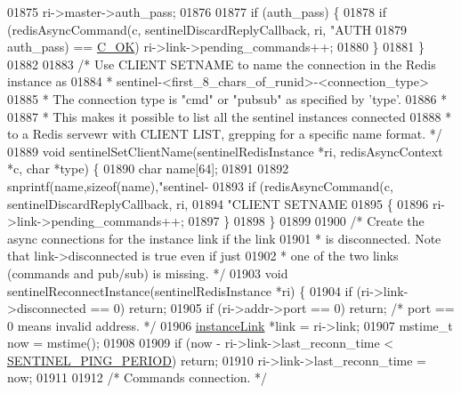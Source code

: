\begin{DoxyCode}
{{{{{{{{{{{{{{{{{{{{{{{{{{{{{{{{{01875                                                  ri->master->auth\_pass;
01876 
01877     \textcolor{keywordflow}{if} (auth\_pass) \{
01878         \textcolor{keywordflow}{if} (redisAsyncCommand(c, sentinelDiscardReplyCallback, ri, \textcolor{stringliteral}{"AUTH %
01879             auth\_pass) == \hyperlink{server_8h_a303769ef1065076e68731584e758d3e1}{C\_OK}) ri->link->pending\_commands++;
01880     \}
01881 \}
01882 
01883 \textcolor{comment}{/* Use CLIENT SETNAME to name the connection in the Redis instance as}
01884 \textcolor{comment}{ * sentinel-<first\_8\_chars\_of\_runid>-<connection\_type>}
01885 \textcolor{comment}{ * The connection type is "cmd" or "pubsub" as specified by 'type'.}
01886 \textcolor{comment}{ *}
01887 \textcolor{comment}{ * This makes it possible to list all the sentinel instances connected}
01888 \textcolor{comment}{ * to a Redis servewr with CLIENT LIST, grepping for a specific name format. */}
01889 \textcolor{keywordtype}{void} sentinelSetClientName(sentinelRedisInstance *ri, redisAsyncContext *c, \textcolor{keywordtype}{char} *type) \{
01890     \textcolor{keywordtype}{char} name[64];
01891 
01892     snprintf(name,\textcolor{keyword}{sizeof}(name),\textcolor{stringliteral}{"sentinel-%
01893     \textcolor{keywordflow}{if} (redisAsyncCommand(c, sentinelDiscardReplyCallback, ri,
01894         \textcolor{stringliteral}{"CLIENT SETNAME %
01895     \{
01896         ri->link->pending\_commands++;
01897     \}
01898 \}
01899 
01900 \textcolor{comment}{/* Create the async connections for the instance link if the link}
01901 \textcolor{comment}{ * is disconnected. Note that link->disconnected is true even if just}
01902 \textcolor{comment}{ * one of the two links (commands and pub/sub) is missing. */}
01903 \textcolor{keywordtype}{void} sentinelReconnectInstance(sentinelRedisInstance *ri) \{
01904     \textcolor{keywordflow}{if} (ri->link->disconnected == 0) \textcolor{keywordflow}{return};
01905     \textcolor{keywordflow}{if} (ri->addr->port == 0) \textcolor{keywordflow}{return}; \textcolor{comment}{/* port == 0 means invalid address. */}
01906     \hyperlink{structinstanceLink}{instanceLink} *link = ri->link;
01907     mstime\_t now = mstime();
01908 
01909     \textcolor{keywordflow}{if} (now - ri->link->last\_reconn\_time < \hyperlink{sentinel_8c_a9e22409355fa7a4db7f3a43fbe2d9101}{SENTINEL\_PING\_PERIOD}) \textcolor{keywordflow}{return};
01910     ri->link->last\_reconn\_time = now;
01911 
01912     \textcolor{comment}{/* Commands connection. */}
}}}}}}}}}}}}}}}}}}}}}}}}}}}}}}}}}}}}
\end{DoxyCode}
